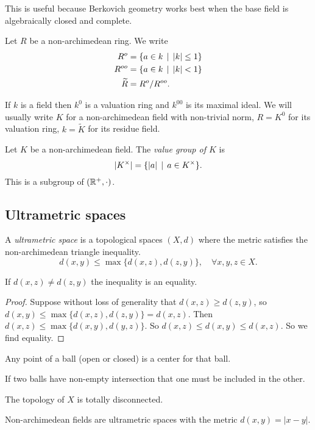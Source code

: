 This is useful because Berkovich geometry works best when the base field is algebraically closed and complete. 

\begin{definition}
	Let $R$ be a non-archimedean ring. We write 
	\begin{align*}
		R^{o} &= \{a \in k \st |k| \le 1\}  \\
		R^{oo} &=  \{a \in k \st |k| < 1\}  \\
		\widetilde R &= R^{o} / R^{oo}
	.\end{align*}
\end{definition}

If $k$ is a field then $k^{0}$ is a valuation ring and $ k^{00}$ is its maximal ideal. 
We will usually write $K$ for a non-archimedean field with non-trivial norm, $R = K^{0}$ for its valuation ring, $k = \widetilde K$ for its residue field. 

\begin{definition}
	Let $K$ be a non-archimedean field. 
	The \emph{value group of $K$} is \[
	|K^{\times }| = \{|a| \st  a \in K^{\times }  \} 
	.\] 
	This is a subgroup of $(\mathbb{R}^{ +}, \cdot )$. 
\end{definition}


\subsection{Ultrametric spaces} \label{sec:ultrametric_spaces}

\begin{definition}
	A \emph{ultrametric space} is a topological spaces $(X, d)$ where the metric satisfies the non-archimedean triangle inequality. 
	\[
		d(x, y) \le \max \{d(x, z) ,d(z, y)\}, \quad \forall x, y ,z \in X
	.\] 
\end{definition}
\begin{lemma}
	If $d(x,z) \ne d(z,y)$ the inequality is an equality. 
\end{lemma}
\begin{proof}
	Suppose without loss of generality that $d(x, z) \ge d(z,y)$, so $d(x, y) \le \max \{d(x, z), d(z,y)\} = d(x, z) $. 
	Then $d(x, z) \le \max \{d(x, y), d(y,z)\}$. So $d(x, z) \le d(x, y) \le d(x, z)$. So we find equality.
\end{proof}
\begin{corollary}
	Any point of a ball (open or closed) is a center for that ball. 
\end{corollary}
\begin{corollary}
	If two balls have non-empty intersection that one must be included in the other. 
\end{corollary}
\begin{corollary}
	The topology of $X$ is totally disconnected. 
\end{corollary}

Non-archimedean fields are ultrametric spaces with the metric $d(x, y) = |x - y|$. 

